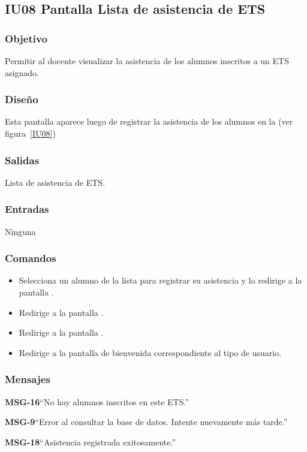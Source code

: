\subsection{IU08 Pantalla Lista de asistencia de ETS}

\subsubsection{Objetivo}
Permitir al docente visualizar la asistencia de los alumnos inscritos a un ETS asignado.

\subsubsection{Diseño}
Esta pantalla aparece luego de registrar la asistencia de los alumnos en la  (ver figura~\ref{IU08})


\subsubsection{Salidas}
Lista de asistencia de ETS.

\subsubsection{Entradas}
Ninguna

\subsubsection{Comandos}
\begin{itemize}
	\item {} Selecciona un alumno de la lista para registrar su asistencia y lo redirige a la pantalla .
	\item {} Redirige a la pantalla .
    \item {} Redirige a la pantalla .
    \item {} Redirige a la pantalla de bienvenida correspondiente al tipo de usuario.
\end{itemize}

\subsubsection{Mensajes}

\begin{Citemize}
	\item {\bf MSG-16}{``No hay alumnos inscritos en este ETS.''}
	\item {\bf MSG-9}{``Error al consultar la base de datos. Intente nuevamente más tarde.''}
	\item {\bf MSG-18}{``Asistencia registrada exitosamente.''}  
\end{Citemize}